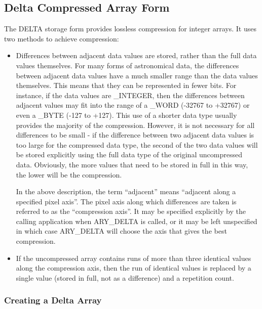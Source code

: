 \documentclass[twoside,11pt]{article}
\newcommand{\xlabel}[1]{}
\begin{document}
\subsection{\xlabel{ddelta_form}\label{ss:deltaform}Delta Compressed Array Form}

The DELTA storage form provides lossless compression for integer arrays.
It uses two methods to achieve compression:

\begin{itemize}

\item Differences between adjacent data values are stored, rather than
the full data values themselves. For many forms of astronomical data, the
differences between adjacent data values have a much smaller range than
the data values themselves. This means that they can be represented in
fewer bits. For instance, if the data values are \_INTEGER, then the
differences between adjacent values may fit into the range of a \_WORD
(-32767 to +32767) or even a \_BYTE (-127 to +127). This use of a shorter
data type usually provides the majority of the compression. However, it is not
necessary for all differences to be small - if the difference between two
adjacent data values is too large for the compressed data type, the
second of the two data values will be stored explicitly using the full data
type of the original uncompressed data. Obviously, the more values that
need to be stored in full in this way, the lower will be the compression.

In the above description, the term ``adjacent'' means ``adjacent along a
specified pixel axis''. The pixel axis along which differences are taken
is referred to as the ``compression axis''. It may be specified
explicitly by the calling application when ARY\_DELTA is called, or it
may be left unspecified in which case ARY\_DELTA will choose the axis that
gives the best compression.

\item If the uncompressed array contains runs of more than three identical
values along the compression axis, then the run of identical values is
replaced by a single value (stored in full, not as a difference) and a
repetition count.

\end{itemize}

\subsubsection{Creating a Delta Array}
\end{document}
